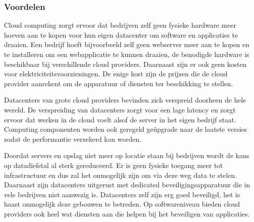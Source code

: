 \subsubsection{Voordelen}

\begin{description}[style=unboxed, labelwidth=\linewidth, listparindent =0pt]
    \item[Lagere kosten]
    Cloud computing zorgt ervoor dat bedrijven zelf geen fysieke hardware meer hoeven aan te kopen voor hun eigen datacenter om software en applicaties te draaien. Een bedrijf hoeft bijvoorbeeld zelf geen webserver meer aan te kopen en te installeren om een webapplicatie te kunnen draaien, de benodigde hardware is beschikbaar bij verschillende cloud providers. Daarnaast zijn er ook geen kosten voor elektriciteitsvoorzieningen. De enige kost zijn de prijzen die de cloud provider aanrekent om de apparatuur of diensten ter beschikking te stellen.
    \newline

    \item[Performantie]
    Datacenters van grote cloud providers bevinden zich verspreid doorheen de hele wereld. De verspreiding van datacenters zorgt voor een lage latency en zorgt ervoor dat werken in de cloud voelt alsof de server in het eigen bedrijf staat. Computing componenten worden ook geregeld geüpgrade naar de laatste versies zodat de performantie verzekerd kan worden.
    \newline

    \item [Veiligheid]
    Doordat servers en opslag niet meer op locatie staan bij bedrijven wordt de kans op datadiefstal al sterk gereduceerd. Er is geen fysieke toegang meer tot infrastructuur en dus zal het onmogelijk zijn om via deze weg data te stelen. Daarnaast zijn datacenters uitgerust met dedicated beveiligingsapparatuur die in vele bedrijven niet aanwezig is. Datacenters zelf zijn erg goed beveiligd, het is haast onmogelijk deze gebouwen te betreden. Op softwareniveau bieden cloud providers ook heel wat diensten aan die helpen bij het beveiligen van applicaties.
    \newline


\end{description}
